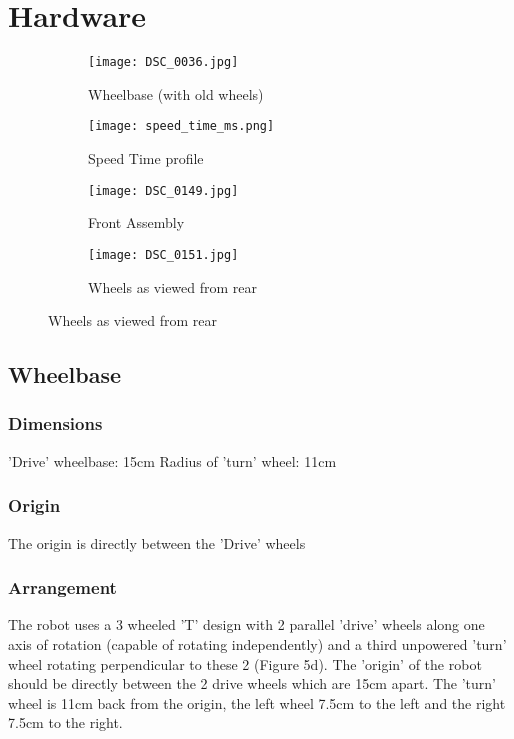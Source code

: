 \section{Hardware}

\begin{figure}[H]
\begin{subfigure}{.45\textwidth}
\centering
\texttt{[image: DSC\_0036.jpg]}
\caption{Wheelbase (with old wheels)}
\label{pic:wheelbase}
\end{subfigure}
\begin{subfigure}{.45\textwidth}
\centering
\texttt{[image: speed\_time\_ms.png]}
\caption{Speed Time profile}
\label{pic:front}
\end{subfigure}
\label{pic:construction}

\begin{subfigure}{.45\textwidth}
\centering
\texttt{[image: DSC\_0149.jpg]}
\caption{Front Assembly}
\label{pic:wheelbase}
\end{subfigure}
\begin{subfigure}{.45\textwidth}
\centering
\texttt{[image: DSC\_0151.jpg]}
\caption{Wheels as viewed from rear}
\label{pic:front}
\end{subfigure}

\label{pic:construction}
\end{figure}

\subsection{Wheelbase}
\subsubsection{Dimensions}
'Drive' wheelbase:		15cm \newline
Radius of 'turn' wheel: 11cm
\subsubsection{Origin}
The origin is directly between the 'Drive' wheels
\subsubsection{Arrangement}
The robot uses a 3 wheeled 'T' design with 2 parallel 'drive' wheels along one axis of rotation (capable of rotating independently) and a third unpowered 'turn' wheel rotating perpendicular to these 2 (Figure 5d). The 'origin' of the robot should be 
directly between the 2 drive wheels which are 15cm apart. The 'turn' wheel 
is 11cm back from the origin, the left wheel 7.5cm to the left and the right
7.5cm to the right. 

